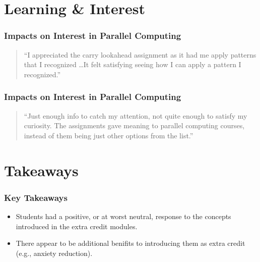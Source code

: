 \documentclass{beamer}
\begin{document}
\section{Learning \&  Interest}

\begin{frame}
    \frametitle{Impacts on Interest in Parallel Computing}

    \begin{figure}
      
    \end{figure}


    \begin{quote}
      ``I appreciated the carry lookahead assignment as it had me apply
      patterns that I recognized \ldots It felt satisfying seeing how I can
      apply a pattern I recognized.''
    \end{quote}
\end{frame}

\begin{frame}
    \frametitle{Impacts on Interest in Parallel Computing}

    \begin{figure}
      
    \end{figure}

    \vfill
    \begin{quote}
      ``Just enough info to catch my attention, not quite enough to satisfy my
      curiosity. The assignments gave meaning to parallel computing courses,
      instead of them being just other options from the list.''
    \end{quote}
    \vfill
\end{frame}

\section{Takeaways}

\begin{frame}
    \frametitle{Key Takeaways}

    \begin{itemize}
      \item Students had a positive, or at worst neutral, response to the concepts introduced in the extra credit modules.
      \item There appear to be additional benifits to introducing them as extra credit (e.g., anxiety reduction).
    \end{itemize}
\end{frame}
\end{document}
